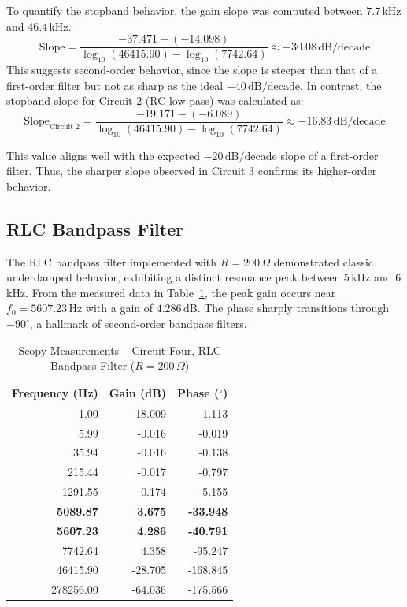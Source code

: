 \documentclass[12pt]{article}
\begin{document}
To quantify the stopband behavior, the gain slope was computed between $7.7$ kHz
and $46.4$ kHz.
\[
	\text{Slope} = \frac{-37.471 - (-14.098)}{\log_{10}(46415.90) - \log_{10}(7742.64)} \approx -30.08\,\mathrm{dB/decade}
\]
This suggests second-order behavior, since the slope is steeper than that of a first-order filter but not as sharp as the ideal $-40\,\mathrm{dB/decade}$. In contrast, the stopband slope for Circuit 2 (RC low-pass) was calculated as:
\[
	\text{Slope}_{\text{Circuit 2}} = \frac{-19.171 - (-6.089)}{\log_{10}(46415.90) - \log_{10}(7742.64)} \approx -16.83\,\mathrm{dB/decade}
\]

This value aligns well with the expected $-20\,\mathrm{dB/decade}$ slope of a first-order filter. Thus, the sharper slope observed in Circuit 3 confirms its higher-order behavior.

\subsection{RLC Bandpass Filter}

The RLC bandpass filter implemented with $R = 200\,\Omega$ demonstrated classic underdamped behavior, exhibiting a distinct resonance peak between 5\,kHz and 6\,kHz. From the measured data in Table~\ref{tab:rlc_bandpass}, the peak gain occurs near $f_0 = 5607.23\,\mathrm{Hz}$ with a gain of $4.286\,\mathrm{dB}$. The phase sharply transitions through $-90^\circ$, a hallmark of second-order bandpass filters.

\begin{table}[H]
	\centering
	\caption{Scopy Measurements – Circuit Four, RLC Bandpass Filter ($R=200\,\Omega$)}
	\label{tab:rlc_bandpass}
	\begin{tabular}{|r|r|r|}
		\hline
		\textbf{Frequency (Hz)} & \textbf{Gain (dB)} & \textbf{Phase ($^\circ$)} \\
		\hline
		1.00                    & 18.009             & 1.113                     \\
		5.99                    & -0.016             & -0.019                    \\
		35.94                   & -0.016             & -0.138                    \\
		215.44                  & -0.017             & -0.797                    \\
		1291.55                 & 0.174              & -5.155                    \\
		\textbf{5089.87}        & \textbf{3.675}     & \textbf{-33.948}          \\
		\textbf{5607.23}        & \textbf{4.286}     & \textbf{-40.791}          \\
		7742.64                 & 4.358              & -95.247                   \\
		46415.90                & -28.705            & -168.845                  \\
		278256.00               & -64.036            & -175.566                  \\
		\hline
	\end{tabular}
\end{table}
\end{document}
